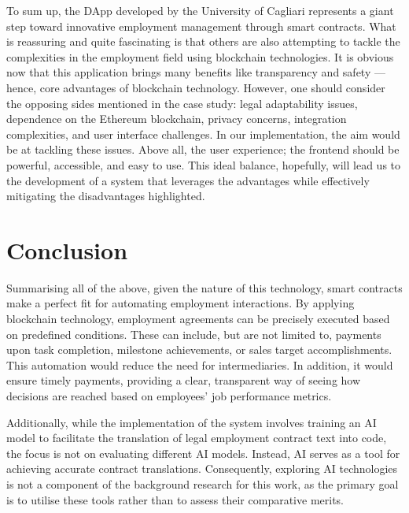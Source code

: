 To sum up, the DApp developed by the University of Cagliari represents a giant step toward innovative employment management through smart contracts. What is reassuring and quite fascinating is that others are also attempting to tackle the complexities in the employment field using blockchain technologies. It is obvious now that this application brings many benefits like transparency and safety — hence, core advantages of blockchain technology. However, one should consider the opposing sides mentioned in the case study: legal adaptability issues, dependence on the Ethereum blockchain, privacy concerns, integration complexities, and user interface challenges. In our implementation, the aim would be at tackling these issues. Above all, the user experience; the frontend should be powerful, accessible, and easy to use. This ideal balance, hopefully, will lead us to the development of a system that leverages the advantages while effectively mitigating the disadvantages highlighted.

\section{Conclusion}

Summarising all of the above, given the nature of this technology, smart contracts make a perfect fit for automating employment interactions. By applying blockchain technology, employment agreements can be precisely executed based on predefined conditions. These can include, but are not limited to, payments upon task completion, milestone achievements, or sales target accomplishments. This automation would reduce the need for intermediaries. In addition, it would ensure timely payments, providing a clear, transparent way of seeing how decisions are reached based on employees' job performance metrics.

Additionally, while the implementation of the system involves training an AI model to facilitate the translation of legal employment contract text into code, the focus is not on evaluating different AI models. Instead, AI serves as a tool for achieving accurate contract translations. Consequently, exploring AI technologies is not a component of the background research for this work, as the primary goal is to utilise these tools rather than to assess their comparative merits.